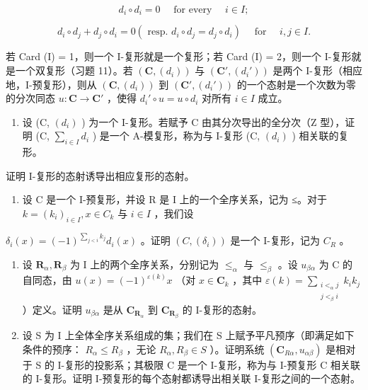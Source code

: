 \[
d _ {i} \circ d _ {i} = 0 \quad \text { for every } \quad i \in I;
\]

\[
d _ {i} \circ d _ {j} + d _ {j} \circ d _ {i} = 0 (\text { resp. } d _ {i} \circ d _ {j} = d _ {j} \circ d _ {i}) \quad \text { for } \quad i, j \in I.
\]

若 Card (I) = 1，则一个 I-复形就是一个复形；若 Card (I) = 2，则一个 I-复形就是一个双复形（习题 11）。若 \((\mathbf{C}, (d_i))\) 与 \((\mathbf{C}', (d_i'))\) 是两个 I-复形（相应地，I-预复形），则从 \((\mathbf{C}, (d_i))\) 到 \((\mathbf{C}', (d_i'))\) 的一个态射是一个次数为零的分次同态 \(u: \mathbf{C} \to \mathbf{C}'\) ，使得 \(d_i' \circ u = u \circ d_i\) 对所有 \(i \in I\) 成立。

\begin{enumerate}
\def\labelenumi{\alph{enumi})}
\tightlist
\item
  设 (C, \((d_i)\) ) 为一个 I-复形。若赋予 C 由其分次导出的全分次（Z 型），证明 (C, \(\sum_{i\in I}d_i\) ) 是一个 A-模复形，称为与 I-复形 (C, \((d_i)\) ) 相关联的复形。
\end{enumerate}

证明 I-复形的态射诱导出相应复形的态射。

\begin{enumerate}
\def\labelenumi{\alph{enumi})}
\setcounter{enumi}{1}
\tightlist
\item
  设 C 是一个 I-预复形，并设 R 是 I 上的一个全序关系，记为 ≤。对于 \(k = (k_i)_{i \in I}, x \in C_k\) 与 \(i \in I\) ，我们设
\end{enumerate}

\(\delta_{i}(x) = (-1)^{\sum_{j < i} k_{j}} d_{i}(x)\) 。证明 \((C, (\delta_{i}))\) 是一个 I-复形，记为 \(C_{R}\) 。

\begin{enumerate}
\def\labelenumi{\alph{enumi})}
\setcounter{enumi}{2}
\item
  设 \(\mathbf{R}_{\alpha}, \mathbf{R}_{\beta}\) 为 I 上的两个全序关系，分别记为 \(\leqslant_{\alpha}\) 与 \(\leqslant_{\beta}\) 。设 \(u_{\beta \alpha}\) 为 C 的自同态，由 \(u(x) = (-1)^{\varepsilon(k)} x\) （对 \(x \in \mathbf{C}_k\) ，其中 \(\varepsilon(k) = \sum_{\substack{i < _{\alpha} j \\ j < _{\beta} i}} k_i k_j\) ）定义。证明 \(u_{\beta \alpha}\) 是从 \(\mathbf{C}_{\mathbf{R}_{\alpha}}\) 到 \(\mathbf{C}_{\mathbf{R}_{\beta}}\) 的 I-复形的态射。
\item
  设 S 为 I 上全体全序关系组成的集；我们在 S 上赋予平凡预序（即满足如下条件的预序： \(R_{\alpha} \leqslant R_{\beta}\) ，无论 \(R_{\alpha}, R_{\beta} \in S\) ）。证明系统 \((\mathbf{C}_{R\alpha}, u_{\alpha\beta})\) 是相对于 S 的 I-复形的投影系；其极限 C 是一个 I-复形，称为与 I-预复形 C 相关联的 I-复形。证明 I-预复形的每个态射都诱导出相关联 I-复形之间的一个态射。
\end{enumerate}

